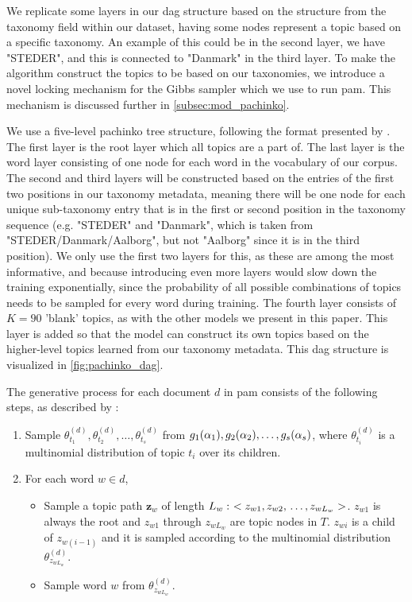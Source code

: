 We replicate some layers in our \gls{dag} structure based on the structure from the taxonomy field within our dataset, having some nodes represent a topic based on a specific taxonomy.
An example of this could be in the second layer, we have "STEDER", and this is connected to "Danmark" in the third layer.
To make the algorithm construct the topics to be based on our taxonomies, we introduce a novel locking mechanism for the Gibbs sampler which we use to run \gls{pam}.
This mechanism is discussed further in \autoref{subsec:mod_pachinko}.

We use a five-level pachinko tree structure, following the format presented by \citet{li2006pachinko}.
The first layer is the root layer which all topics are a part of.
The last layer is the word layer consisting of one node for each word in the vocabulary of our corpus.
The second and third layers will be constructed based on the entries of the first two positions in our taxonomy metadata, meaning there will be one node for each unique sub-taxonomy entry that is in the first or second position in the taxonomy sequence (e.g. "STEDER" and "Danmark", which is taken from "STEDER/Danmark/Aalborg", but not "Aalborg" since it is in the third position).
We only use the first two layers for this, as these are among the most informative, and because introducing even more layers would slow down the training exponentially, since the probability of all possible combinations of topics needs to be sampled for every word during training. 
The fourth layer consists of $K = 90$ 'blank' topics, as with the other models we present in this paper.
This layer is added so that the model can construct its own topics based on the higher-level topics learned from our taxonomy metadata.
This \gls{dag} structure is visualized in \autoref{fig:pachinko_dag}. 

The generative process for each document $d$ in \gls{pam} consists of the following steps, as described by \citet{li2006pachinko}:
\begin{enumerate}
	\item Sample $\theta_{t_1}^{(d)}, \theta_{t_2}^{(d)}, \dots, \theta_{t_s}^{(d)}$ from $g_1(\alpha_1), g_2(\alpha_2), \dots, \newline g_s(\alpha_s)$, where $\theta_{t_i}^{(d)}$ is a multinomial distribution of topic $t_i$ over its children.
	\item For each word $w \in d$,
	\begin{itemize}
		\item Sample a topic path $\mathbf{z}_w$ of length $L_w:~< z_{w1}, z_{w2},\newline \dots, z_{wL_w} >$. $z_{w1}$ is always the root and $z_{w1}$ through $z_{wL_w}$ are topic nodes in $T$. $z_{wi}$ is a child of $z_{w(i-1)}$ and it is sampled according to the multinomial distribution $\theta_{z_{wL_w}}^{(d)}$.
		\item Sample word $w$ from $\theta_{z_{wL_w}}^{(d)}$.
	\end{itemize}
\end{enumerate}


